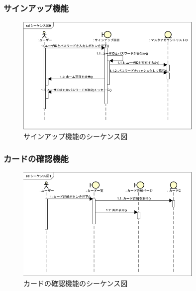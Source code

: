 \documentclass{ltjsarticle}
\begin{document}
\subsubsection{サインアップ機能}
\begin{figure}[H]
    \centering
    \includegraphics[width=0.8\textwidth]{src/signupSequence.png}
    \caption{サインアップ機能のシーケンス図}
    \label{fig:sequenceSignup}
\end{figure}

\subsubsection{カードの確認機能}
\begin{figure}[H]
    \centering
    \includegraphics[width=0.8\textwidth]{src/cardSequence.png}
    \caption{カードの確認機能のシーケンス図}
    \label{fig:sequenceCard}
\end{figure}
\end{document}

